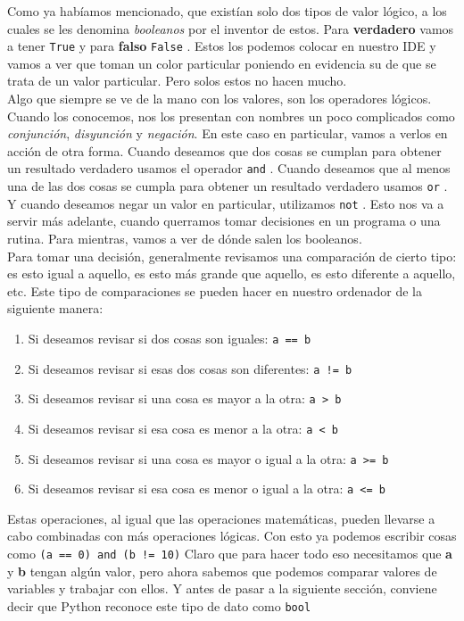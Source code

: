 \documentclass[10pt,letterpaper]{article}
\newcommand{\inlinecode}[1]{
\colorbox{light-gray}{\texttt{#1}}
}
\begin{document}
Como ya hab\'iamos mencionado, que exist\'ian solo dos tipos de valor l\'ogico, a los cuales se les denomina \emph{booleanos} por el inventor de estos. Para \textbf{verdadero} vamos a tener \inlinecode{True} y para \textbf{falso} \inlinecode{False}. Estos los podemos colocar en nuestro IDE y vamos a ver que toman un color particular poniendo en evidencia su de que se trata de un valor particular. Pero solos estos no hacen mucho.\\

Algo que siempre se ve de la mano con los valores, son los operadores l\'ogicos. Cuando los conocemos, nos los presentan con nombres un poco complicados como \emph{conjunci\'on}, \emph{disyunci\'on} y \emph{negaci\'on}. En este caso en particular, vamos a verlos en acci\'on de otra forma. Cuando deseamos que dos cosas se cumplan para obtener un resultado verdadero usamos el operador \inlinecode{and}. Cuando deseamos que al menos una de las dos cosas se cumpla para obtener un resultado verdadero usamos \inlinecode{or}. Y cuando deseamos negar un valor en particular, utilizamos \inlinecode{not}. Esto nos va a servir m\'as adelante, cuando querramos tomar decisiones en un programa o una rutina. Para mientras, vamos a ver de d\'onde salen los booleanos.\\

Para tomar una decisi\'on, generalmente revisamos una comparaci\'on de cierto tipo: es esto igual a aquello, es esto m\'as grande que aquello, es esto diferente a aquello, etc. Este tipo de comparaciones se pueden hacer en nuestro ordenador de la siguiente manera:

\begin{enumerate}
\item Si deseamos revisar si dos cosas son iguales: \inlinecode{a == b}
\item Si deseamos revisar si esas dos cosas son diferentes: \inlinecode{a != b}
\item Si deseamos revisar si una cosa es mayor a la otra: \inlinecode{a >\ b}
\item Si deseamos revisar si esa cosa es menor a la otra: \inlinecode{a <\ b}
\item Si deseamos revisar si una cosa es mayor o igual a la otra: \inlinecode{a >= b}
\item Si deseamos revisar si esa cosa es menor o igual a la otra: \inlinecode{a <= b}
\end{enumerate}

Estas operaciones, al igual que las operaciones matem\'aticas, pueden llevarse a cabo combinadas con m\'as operaciones l\'ogicas. Con esto ya podemos escribir cosas como \inlinecode{(a == 0) and (b != 10)} Claro que para hacer todo eso necesitamos que \textbf{a} y \textbf{b} tengan alg\'un valor, pero ahora sabemos que podemos comparar valores de variables y trabajar con ellos. Y antes de pasar a la siguiente secci\'on, conviene decir que Python reconoce este tipo de dato como \inlinecode{bool}
\end{document}

